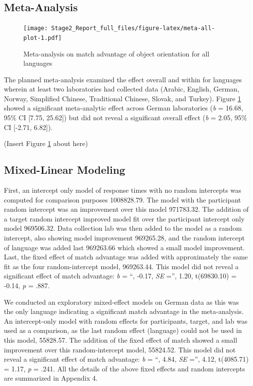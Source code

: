 \documentclass[
  man]{apa7}
\begin{document}
\hypertarget{meta-analysis}{%
\subsection{Meta-Analysis}\label{meta-analysis}}

\begin{figure}
\centering
\texttt{[image: Stage2\_Report\_full\_files/figure-latex/meta-all-plot-1.pdf]}
\caption{\label{fig:meta-all-plot}Meta-analysis on match advantage of object orientation for all languages}
\end{figure}

The planned meta-analysis examined the effect overall and within for languages wherein at least two laboratories had collected data (Arabic, English, German, Norway, Simplified Chinese, Traditional Chinese, Slovak, and Turkey). Figure \ref{fig:meta-all-plot} showed a significant meta-analytic effect across German laboratories (\emph{b} = 16.68, 95\% CI {[}7.75, 25.62{]}) but did not reveal a significant overall effect (\emph{b} = 2.05, 95\% CI {[}-2.71, 6.82{]}).

(Insert Figure \ref{fig:meta-all-plot} about here)

\hypertarget{mixed-linear-modeling}{%
\subsection{Mixed-Linear Modeling}\label{mixed-linear-modeling}}

First, an intercept only model of response times with no random intercepts was computed for comparison purposes 1008828.79. The model with the participant random intercept was an improvement over this model 971783.32. The addition of a target random intercept improved model fit over the participant intercept only model 969506.32. Data collection lab was then added to the model as a random intercept, also showing model improvement 969265.28, and the random intercept of language was added last 969263.66 which showed a small model improvement. Last, the fixed effect of match advantage was added with approximately the same fit as the four random-intercept model, 969263.44. This model did not reveal a significant effect of match advantage: \emph{b} = ``, -0.17, \emph{SE} ='', 1.20, t(69830.10) = -0.14, \emph{p} = .887.

We conducted an exploratory mixed-effect models on German data as this was the only language indicating a significant match advantage in the meta-analysis. An intercept-only model with random effects for participants, target, and lab was used as a comparison, as the last random effect (language) could not be used in this model, 55828.57. The addition of the fixed effect of match showed a small improvement over this random-intercept model, 55824.52. This model did not reveal a significant effect of match advantage: \emph{b} = ``, 4.84, \emph{SE} ='', 4.12, t(4085.71) = 1.17, \emph{p} = .241. All the details of the above fixed effects and random intercepts are summarized in Appendix 4.
\end{document}
